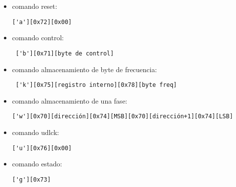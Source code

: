 \begin{itemize}
\item comando reset: \begin{verbatim}['a'][0x72][0x00] \end{verbatim}
\item comando control: \begin{verbatim} ['b'][0x71][byte de control] \end{verbatim}
\item comando almacenamiento de byte de frecuencia: \begin{verbatim} ['k'][0x75][registro interno][0x78][byte freq]\end{verbatim}
\item comando almacenamiento de una fase: \begin{verbatim}['w'][0x70][dirección][0x74][MSB][0x70][dirección+1][0x74][LSB]\end{verbatim}
\item comando udlck: \begin{verbatim}['u'][0x76][0x00] \end{verbatim}
\item comando estado: \begin{verbatim}['g'][0x73] \end{verbatim}
\end{itemize}
\newpage